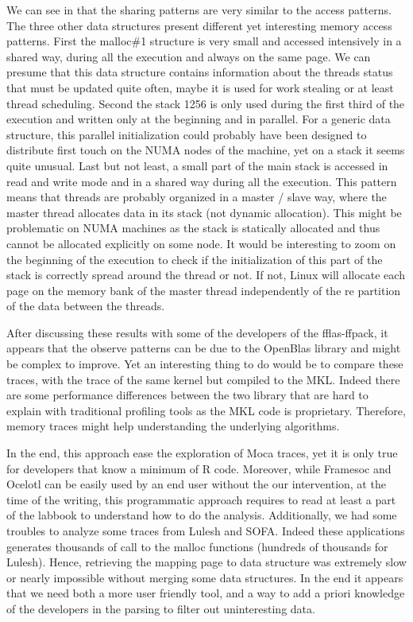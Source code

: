 We can see in  that the sharing patterns are very similar to the access patterns.
The three other data structures present different yet interesting memory access patterns.
First the malloc\#1 structure is very small and accessed intensively in a shared way, during all the execution and always on the same page.
We can presume that this data structure contains information about the threads status that must be updated quite often, maybe it is used for work stealing or at least thread scheduling.
Second the stack 1256 is only used during the first third of the execution and written only at the beginning and in parallel.
For a generic data structure, this parallel initialization could probably have been designed to distribute first touch on the \gls{NUMA} nodes of the machine, yet on a stack it seems quite unusual.
Last but not least, a small part of the main stack is accessed in read and write mode and in a shared way during all the execution.
This pattern means that threads are probably organized in a master / slave way, where the master thread allocates data in its stack (not dynamic allocation).
This might be problematic on \gls{NUMA} machines as the stack is statically allocated and thus cannot be allocated explicitly on some node.
It would be interesting to zoom on the beginning of the execution to check if the initialization of this part of the stack is correctly spread around the thread or not.
If not, Linux will allocate each page on the memory bank of the master thread independently of the re partition of the data between the threads.

After discussing these results with some of the developers of the fflas-ffpack, it appears that the observe patterns can be due to the OpenBlas library and might be complex to improve.
Yet an interesting thing to do would be to compare these traces, with the trace of the same kernel but compiled to the \gls{MKL}.
Indeed there are some performance differences between the two library that are hard to explain with traditional profiling tools as the \gls{MKL} code is proprietary.
Therefore, memory traces might help understanding the underlying algorithms.

In the end, this approach ease the exploration of \gls{Moca} traces, yet it is only true for developers that know a minimum of \gls{R} code.
Moreover, while \gls{Framesoc} and \gls{Ocelotl} can be easily used by an end user without the our intervention, at the time of the writing, this programmatic approach requires to read at least a part of the labbook to understand how to do the analysis.
Additionally, we had some troubles to analyze some traces from Lulesh and \gls{SOFA}.
Indeed these applications generates thousands of call to the malloc functions (hundreds of thousands for Lulesh).
Hence, retrieving the mapping page to data structure was extremely slow or nearly impossible without merging some data structures.
In the end it appears that we need both a more user friendly tool, and a way to add a priori knowledge of the developers in the parsing to filter out uninteresting data.

